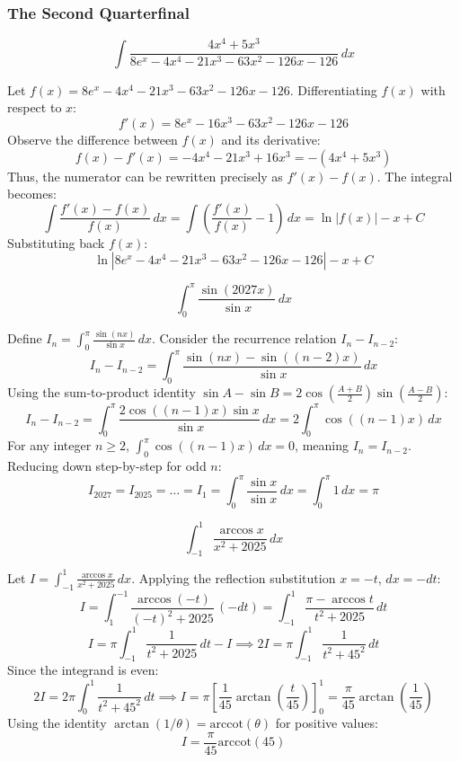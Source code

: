\subsubsection*{The Second Quarterfinal}
\begin{questions}
\question 
\[ \int \frac{4x^4 + 5x^3}{8e^x - 4x^4 - 21x^3 - 63x^2 - 126x - 126} \, dx \]
\begin{solution}
Let $f(x) = 8e^x - 4x^4 - 21x^3 - 63x^2 - 126x - 126$. Differentiating $f(x)$ with respect to $x$:
\[ f'(x) = 8e^x - 16x^3 - 63x^2 - 126x - 126 \]
Observe the difference between $f(x)$ and its derivative:
\[ f(x) - f'(x) = -4x^4 - 21x^3 + 16x^3 = -(4x^4 + 5x^3) \]
Thus, the numerator can be rewritten precisely as $f'(x) - f(x)$. The integral becomes:
\[ \int \frac{f'(x) - f(x)}{f(x)} \, dx = \int \left(\frac{f'(x)}{f(x)} - 1\right) \, dx = \ln|f(x)| - x + C \]
Substituting back $f(x)$:
\[ \ln|8e^x - 4x^4 - 21x^3 - 63x^2 - 126x - 126| - x + C \]
\end{solution}

\question 
\[ \int_{0}^{\pi} \frac{\sin(2027x)}{\sin x} \, dx \]
\begin{solution}
Define $I_n = \int_{0}^{\pi} \frac{\sin(nx)}{\sin x} \, dx$. Consider the recurrence relation $I_n - I_{n-2}$:
\[ I_n - I_{n-2} = \int_{0}^{\pi} \frac{\sin(nx) - \sin((n-2)x)}{\sin x} \, dx \]
Using the sum-to-product identity $\sin A - \sin B = 2\cos\left(\frac{A+B}{2}\right)\sin\left(\frac{A-B}{2}\right)$:
\[ I_n - I_{n-2} = \int_{0}^{\pi} \frac{2\cos((n-1)x)\sin x}{\sin x} \, dx = 2\int_{0}^{\pi} \cos((n-1)x) \, dx \]
For any integer $n \ge 2$, $\int_{0}^{\pi} \cos((n-1)x) \, dx = 0$, meaning $I_n = I_{n-2}$. Reducing down step-by-step for odd $n$:
\[ I_{2027} = I_{2025} = \dots = I_1 = \int_{0}^{\pi} \frac{\sin x}{\sin x} \, dx = \int_{0}^{\pi} 1 \, dx = \pi \]
\end{solution}

\question 
\[ \int_{-1}^{1} \frac{\arccos x}{x^2 + 2025} \, dx \]
\begin{solution}
Let $I = \int_{-1}^{1} \frac{\arccos x}{x^2 + 2025} \, dx$. Applying the reflection substitution $x = -t$, $dx = -dt$:
\[ I = \int_{1}^{-1} \frac{\arccos(-t)}{(-t)^2 + 2025} \, (-dt) = \int_{-1}^{1} \frac{\pi - \arccos t}{t^2 + 2025} \, dt \]
\[ I = \pi \int_{-1}^{1} \frac{1}{t^2 + 2025} \, dt - I \implies 2I = \pi \int_{-1}^{1} \frac{1}{t^2 + 45^2} \, dt \]
Since the integrand is even:
\[ 2I = 2\pi \int_{0}^{1} \frac{1}{t^2 + 45^2} \, dt \implies I = \pi \left[ \frac{1}{45}\arctan\left(\frac{t}{45}\right) \right]_{0}^{1} = \frac{\pi}{45}\arctan\left(\frac{1}{45}\right) \]
Using the identity $\arctan(1/\theta) = \text{arccot}(\theta)$ for positive values:
\[ I = \frac{\pi}{45}\text{arccot}(45) \]
\end{solution}
\end{questions}

